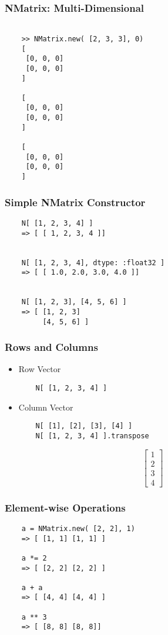 \documentclass[10pt]{beamer}
\begin{document}
\begin{frame}[fragile]
  \frametitle{NMatrix: Multi-Dimensional}
  \begin{verbatim}

    >> NMatrix.new( [2, 3, 3], 0)
    [
     [0, 0, 0]
     [0, 0, 0]
    ]

    [
     [0, 0, 0]
     [0, 0, 0]
    ]

    [
     [0, 0, 0]
     [0, 0, 0]
    ]

  \end{verbatim}
\end{frame}

\begin{frame}[fragile]
  \frametitle{Simple NMatrix Constructor}
  \begin{verbatim}
    N[ [1, 2, 3, 4] ]
    => [ [ 1, 2, 3, 4 ]]


    N[ [1, 2, 3, 4], dtype: :float32 ]
    => [ [ 1.0, 2.0, 3.0, 4.0 ]]


    N[ [1, 2, 3], [4, 5, 6] ]
    => [ [1, 2, 3]
         [4, 5, 6] ]
  \end{verbatim}
\end{frame}

\begin{frame}[fragile]
  \frametitle{Rows and Columns}
  \begin{itemize}
      \item Row Vector
  \begin{verbatim}
    N[ [1, 2, 3, 4] ]
  \end{verbatim}

      \item Column Vector
  \begin{verbatim}
    N[ [1], [2], [3], [4] ]
    N[ [1, 2, 3, 4] ].transpose
  \end{verbatim}
  \end{itemize}
  \[ \begin{bmatrix}
      1 \\ 2 \\ 3 \\ 4
  \end{bmatrix} \]


\end{frame}


\begin{frame}[fragile]
    \frametitle{Element-wise Operations}
    \begin{verbatim}
    a = NMatrix.new( [2, 2], 1)
    => [ [1, 1] [1, 1] ]

    a *= 2
    => [ [2, 2] [2, 2] ]

    a + a
    => [ [4, 4] [4, 4] ]

    a ** 3
    => [ [8, 8] [8, 8]]
    \end{verbatim}
\end{frame}
\end{document}
